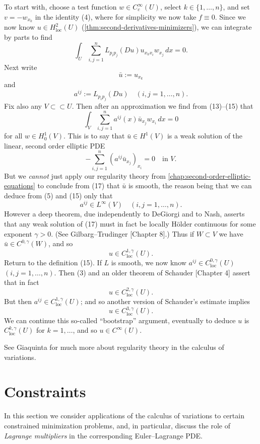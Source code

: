 To start with, choose a test function $w \in C_c^\infty(U)$, select $k \in \{1, \ldots, n\}$, and set $v = -w_{x_k}$ in the identity (4), where for simplicity we now take $f \equiv 0$. Since we now know $u \in H^2_{\text{loc}}(U)$ (\cref{thm:second-derivatives-minimizers}), we can integrate by parts to find
\[
\int_U \sum_{i,j=1}^n L_{p_i p_j}(Du) u_{x_k x_i} w_{x_j}\, dx = 0.
\tag{13}
\]
Next write
\[
\bar{u} := u_{x_k}
\tag{14}
\]
and
\[
a^{ij} := L_{p_i p_j}(Du) \quad (i,j = 1, \ldots, n).
\tag{15}
\]
Fix also any $V \subset\subset U$. Then after an approximation we find from (13)--(15) that
\[
\int_V \sum_{i,j=1}^n a^{ij}(x)\bar{u}_{x_j} w_{x_i}\, dx = 0
\tag{16}
\]
for all $w \in H_0^1(V)$. This is to say that $\bar{u} \in H^1(V)$ is a weak solution of the linear, second order elliptic PDE
\[
-\sum_{i,j=1}^n (a^{ij}\bar{u}_{x_j})_{x_i} = 0 \quad \text{in } V.
\tag{17}
\]
But we \textit{cannot} just apply our regularity theory from \cref{chap:second-order-elliptic-equations} to conclude from (17) that $\bar{u}$ is smooth, the reason being that we can deduce from (5) and (15) only that
\[
a^{ij} \in L^\infty(V) \quad (i,j = 1, \ldots, n).
\]
However a deep theorem, due independently to DeGiorgi and to Nash, asserts that any weak solution of (17) must in fact be locally Hölder continuous for some exponent $\gamma > 0$. (See Gilbarg--Trudinger \cite{GilbargTrudinger1983}[Chapter 8].) Thus if $W \subset V$ we have $\bar{u} \in C^{0,\gamma}(W)$, and so
\[
u \in C_{\text{loc}}^{1,\gamma}(U).
\]
Return to the definition (15). If $L$ is smooth, we now know $a^{ij} \in C_{\text{loc}}^{0,\gamma}(U)$ $(i,j = 1, \ldots, n)$. Then (3) and an older theorem of Schauder \cite{GilbargTrudinger1983}[Chapter 4] assert that in fact
\[
u \in C_{\text{loc}}^{2,\gamma}(U).
\]
But then $a^{ij} \in C_{\text{loc}}^{1,\gamma}(U)$; and so another version of Schauder's estimate implies
\[
u \in C_{\text{loc}}^{3,\gamma}(U).
\]
We can continue this so-called ``bootstrap'' argument, eventually to deduce $u$ is $C_{\text{loc}}^{k,\gamma}(U)$ for $k = 1, \ldots$, and so $u \in C^\infty(U)$.

See Giaquinta \cite{Giaquinta1983} for much more about regularity theory in the calculus of variations.

\section{Constraints}
\label{sec:constraints-calculus-of-variations}

In this section we consider applications of the calculus of variations to certain constrained minimization problems, and, in particular, discuss the role of \textit{Lagrange multipliers} in the corresponding Euler--Lagrange PDE.

